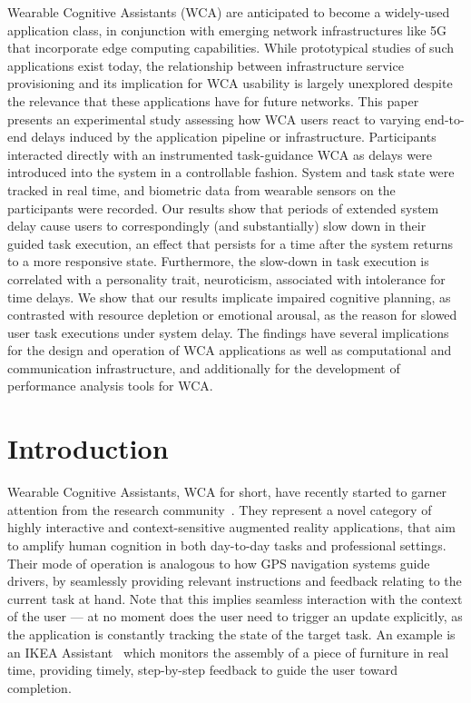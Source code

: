 \documentclass[10pt,letterpaper]{article}
\providecommand{\DIFaddtex}[1]{#1} %
\providecommand{\DIFdeltex}[1]{} %
\providecommand{\DIFaddbegin}{\protect\color{blue}} %
\providecommand{\DIFaddend}{\protect\color{black}} %
\providecommand{\DIFdelbegin}{\protect\color{red}} %
\providecommand{\DIFdelend}{\protect\color{black}} %
\providecommand{\DIFadd}[1]{\texorpdfstring{\DIFaddtex{#1}}{#1}} %
\providecommand{\DIFdel}[1]{\texorpdfstring{\DIFdeltex{#1}}{}} %
\newcommand{\DIFscaledelfig}{0.5}
\newlength{\DIFdelgraphicswidth} %
\newlength{\DIFdelgraphicsheight} %
\newcommand{\DIFaddincludegraphics}[2][]{{\color{blue}\fbox{\DIFOincludegraphics[#1]{#2}}}} %
\newcommand{\DIFdelincludegraphics}[2][]{%
\sbox{\DIFdelgraphicsbox}{\DIFOincludegraphics[#1]{#2}}%
\settoboxwidth{\DIFdelgraphicswidth}{\DIFdelgraphicsbox} %
\settoboxtotalheight{\DIFdelgraphicsheight}{\DIFdelgraphicsbox} %
\scalebox{\DIFscaledelfig}{%
\parbox[b]{\DIFdelgraphicswidth}{\usebox{\DIFdelgraphicsbox}\\[-\baselineskip] \rule{\DIFdelgraphicswidth}{0em}}\llap{\resizebox{\DIFdelgraphicswidth}{\DIFdelgraphicsheight}{%
\setlength{\unitlength}{\DIFdelgraphicswidth}%
\begin{picture}(1,1)%
\thicklines\linethickness{2pt} %
{\color[rgb]{1,0,0}\put(0,0){\framebox(1,1){}}}%
{\color[rgb]{1,0,0}\put(0,0){\line( 1,1){1}}}%
{\color[rgb]{1,0,0}\put(0,1){\line(1,-1){1}}}%
\end{picture}%
}\hspace*{3pt}}} %
} %
\DeclareRobustCommand{\DIFaddbegin}{\DIFOaddbegin \let\includegraphics\DIFaddincludegraphics} %
\DeclareRobustCommand{\DIFaddend}{\DIFOaddend \let\includegraphics\DIFOincludegraphics} %
\DeclareRobustCommand{\DIFdelbegin}{\DIFOdelbegin \let\includegraphics\DIFdelincludegraphics} %
\DeclareRobustCommand{\DIFdelend}{\DIFOaddend \let\includegraphics\DIFOincludegraphics} %
\begin{document}
Wearable Cognitive Assistants (WCA) are anticipated to become a widely-used application class, in conjunction with emerging network infrastructures like 5G that incorporate edge computing capabilities.
While prototypical studies of such applications exist today, the relationship between infrastructure service provisioning and its implication for WCA usability is largely unexplored despite the relevance that these applications have for future networks.
This paper presents an experimental study assessing how WCA users react to varying end-to-end delays induced by the application pipeline or infrastructure.
Participants interacted directly with an instrumented task-guidance WCA as delays were introduced into the system in a controllable fashion.
System and task state were tracked in real time, and biometric data from wearable sensors on the participants were recorded.
Our results show that periods of extended system delay cause users to correspondingly (and substantially) slow down in their guided task execution, an effect that persists for a time after the system returns to a more responsive state.
Furthermore, the slow-down in task execution is correlated with a personality trait, neuroticism, associated with intolerance for time delays.
We show that our results implicate impaired cognitive planning, as contrasted with resource depletion or emotional arousal, as the reason for slowed user task executions under system delay.
The findings have several implications for the design and operation of WCA applications as well as computational and communication infrastructure, and additionally for the development of performance analysis tools for WCA.\@


\linenumbers%
\section{Introduction}

Wearable Cognitive Assistants, \DIFdelbegin \DIFdel{\emph{WCA} }\DIFdelend \DIFaddbegin \DIFadd{WCA }\DIFaddend for short, have recently started to garner attention from the research community~\cite{Ha:TowardsWearableCogAssist,Chen:EarlyImplementation}.
They represent a novel category of highly interactive and context-sensitive augmented reality applications, that aim to \DIFdelbegin \DIFdel{augment }\DIFdelend \DIFaddbegin \DIFadd{amplify }\DIFaddend human cognition in both day-to-day tasks and professional settings.
Their mode of operation is analogous to how GPS navigation systems guide drivers, by seamlessly providing relevant instructions and feedback relating to the current task at hand.
Note that this implies seamless interaction with the context of the user --- at no moment does the user need to trigger an update explicitly, as the application is constantly tracking the state of the target task.
An example is an IKEA Assistant~\cite{IKEAAssistant} which monitors the assembly of a piece of furniture in real time, providing timely, step-by-step feedback to guide the user toward completion.
\end{document}
